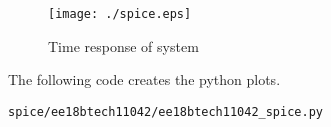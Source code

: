 \begin{enumerate}[label=\thesubsection.\arabic*.,ref=\thesubsection.\theenumi]
\begin{figure}[!ht]
    \texttt{[image: ./spice.eps]}
    \caption{Time response of system}
    \label{fig:ee18btech11042_3}
\end{figure}
The following code creates the python plots.
\begin{lstlisting}
spice/ee18btech11042/ee18btech11042_spice.py
\end{lstlisting}







\end{enumerate}



